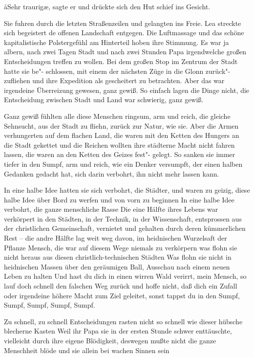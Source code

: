 \aa{}Sehr traurig\ae{}, sagte er und drückte sich den Hut schief ins
Gesicht.

Sie fuhren durch die letzten Straßenzeilen und gelangten
ins Freie. Lea streckte sich begeistert de offenen Landschaft
entgegen. Die Luftmassage und das schöne kapitalistische
Polstergefühl am Hinterteil hoben ihre Stimmung. Es war
ja albern, nach zwei Tagen Stadt und nach zwei Stunden
Papa irgendwelche großen Entscheidungen treffen zu wollen.
Bei dem großen Stop im Zentrum der Stadt hatte sie be"-%
schlossen, mit einem der nächsten Züge in die Glonn zurück"-%
zufliehen und ihre Expedition als gescheitert zu betrachten.
Aber das war irgendeine Überreizung gewesen, ganz gewiß.
So einfach lagen die Dinge nicht, die Entscheidung zwischen
Stadt und Land war schwierig, ganz gewiß.

Ganz gewiß fühlten alle diese Menschen ringsum, arm und
reich, die gleiche Sehnsucht, aus der Stadt zu fliehn, zurück
zur Natur, wie sie. Aber die Armen verhungerten auf dem
flachen Land, die waren mit den Ketten des Hungers an die
Stadt gekettet\semi{} und die Reichen wollten ihre städterne Macht
nicht fahren lassen, die waren an den Ketten des Geizes fest"-%
gelegt. So sanken sie immer tiefer in den Sumpf, arm und
reich, wie ein Denker versumpft, der einen halben Gedanken
gedacht hat, sich darin verbohrt, ihn nicht mehr lassen kann.

In eine halbe Idee hatten sie sich verbohrt, die Städter,
und waren zu geizig, diese halbe Idee über Bord zu werfen
und von vorn zu beginnen\ausr{} In eine halbe Idee verbohrt, die
ganze menschliche Rasse\ausr{} Die eine Hälfte ihres Lebens war
verkörpert in den Städten, in der Technik, in der Wissenschaft,
entsprossen aus der christlichen Gemeinschaft, vernietet und
gehalten durch deren kümmerlichen Rest -- die andre Hälfte
lag weit weg davon, im heidnischen Wurzelsaft der Pflanze
Mensch, die war auf diesem Wege niemals zu verkörpern\dopp{}
was flohn sie nicht heraus aus diesen christlich-technischen
Städten\frag{} Was flohn sie nicht in heidnischen Massen über den
geräumigen Ball, Ausschau nach einem neuen Leben zu
halten\frag{} Und hast du dich in einen wirren Wald verirrt, mein
Mensch, so lauf doch schnell den falschen Weg zurück und hoffe
nicht, daß dich ein Zufall oder irgendeine höhere Macht zum
Ziel geleitet, sonst tappst du in den Sumpf, Sumpf, Sumpf,
Sumpf, Sumpf.

Zu schnell, zu schnell\ausr{} Entscheidungen rasten nicht so schnell
wie dieser hübsche blecherne Kasten\ausr{} Weil ihr Papa sie in der
ersten Stunde schwer enttäuschte, vielleicht durch ihre eigene
Blödigkeit, deswegen mußte nicht die ganze Menschheit
blöde und sie allein bei wachen Sinnen sein\ausr{}


